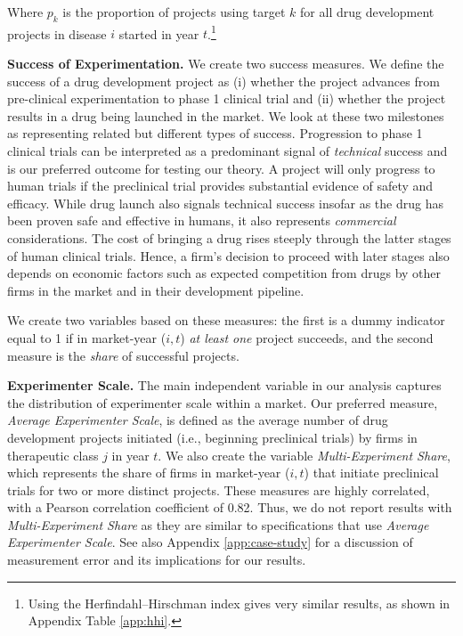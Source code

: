 Where $p_k$ is the proportion of projects using target $k$ for all drug development projects in disease $i$ started in year $t$.\footnote{Using the Herfindahl–Hirschman index gives very similar results, as shown in Appendix Table \ref{app:hhi}.}

\noindent \textbf{Success of Experimentation.} We create two success measures. We define the success of a drug development project as (i) whether the project advances from pre-clinical experimentation to phase 1 clinical trial and (ii) whether the project results in a drug being launched in the market. We look at these two milestones as representing related but different types of success. Progression to phase 1 clinical trials can be interpreted as a predominant signal of \emph{technical} success and is our preferred outcome for testing our theory. A project will only progress to human trials if the preclinical trial provides substantial evidence of safety and efficacy. While drug launch also signals technical success insofar as the drug has been proven safe and effective in humans, it also represents \emph{commercial} considerations. The cost of bringing a drug rises steeply through the latter stages of human clinical trials. Hence, a firm's decision to proceed with later stages also depends on economic factors such as expected competition from drugs by other firms in the market and in their development pipeline.

We create two variables based on these measures: the first is a dummy indicator equal to 1 if in market-year ($i, t$) \emph{at least one} project succeeds, and the second measure is the \emph{share} of successful projects.

\noindent \textbf{Experimenter Scale.} The main independent variable in our analysis captures the distribution of experimenter scale within a market. Our preferred measure, \emph{Average Experimenter Scale}, is defined as the average number of drug development projects initiated (i.e., beginning preclinical trials) by firms in therapeutic class $j$ in year $t$. We also create the variable \emph{Multi-Experiment Share}, which represents the share of firms in market-year ($i, t$) that initiate preclinical trials for two or more distinct projects. These measures are highly correlated, with a Pearson correlation coefficient of 0.82. Thus, we do not report results with \emph{Multi-Experiment Share} as they are similar to specifications that use \emph{Average Experimenter Scale}. See also Appendix \ref{app:case-study} for a discussion of measurement error and its implications for our results.

